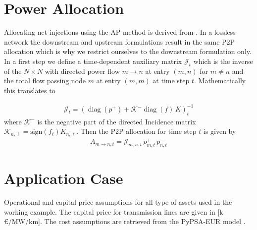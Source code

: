 \documentclass[11pt,twocolumn]{article}
\newcommand{\netconsumption}[1][n]{p^{-}_{#1,t}}
\newcommand{\netproduction}[1][n]{p^{+}_{#1,t}}
\newcommand{\incidence}[1][n]{K_{#1,\ell}}
\newcommand{\allocatepeer}[1][m \rightarrow n]{A_{#1,t}}
\begin{document}
\section{Power Allocation}
\label{sec:net_ap}

\newcommand{\incidenceM}{K}
\newcommand{\flowM}{f}
\newcommand{\injectionM}{p}
\newcommand{\slackM}{k}
\newcommand{\DirectedIncidence}{\mathcal{K}}
\newcommand{\InverseAPInjection}{\mathcal{J}}
\newcommand\diag[1]{\operatorname{diag}\left(#1\right)}


Allocating net injections using the AP method is derived from \cite{achayuthakan_electricity_2010}. In a lossless network the downstream and upstream formulations result in the same P2P allocation which is why we restrict ourselves to the downstream formulation only. In a first step we define a time-dependent auxiliary matrix $\InverseAPInjection_t$ which is the inverse of the $N\times N$ with directed power flow $m \rightarrow n$ at entry $(m, n)$ for $m \ne n$ and the total flow passing node $m$ at entry $\left( m, m\right)$ at time step $t$. Mathematically this translates to


\begin{align}
    \InverseAPInjection_t = \left( \diag{\injectionM^+} + \DirectedIncidence^- \diag{\flowM} \, \incidenceM \right)_t^{-1}
\end{align}
where $\DirectedIncidence^-$ is the negative part of the directed Incidence matrix $\DirectedIncidence_{n,\ell} = \text{sign}\left( f_\ell \right)  \incidence$. Then the P2P allocation for time step $t$ is given by
\begin{align}
    \allocatepeer = \InverseAPInjection_{m,n,t} \, \netproduction[m] \, \netconsumption
\end{align}

\newpage
\section{Application Case}
\label{sec:application_case_appendix}

\begin{table}[h]
    \centering
    
    \caption{Operational and capital price assumptions for all type of assets used in the working example. The capital price for transmission lines are given in [k\,\euro/MW/km]. The cost assumptions are retrieved from the PyPSA-EUR model \cite{horsch_jonas_pypsa-eur_2020}.}
    \label{tab:cost_assumptions}
\end{table}
\end{document}
